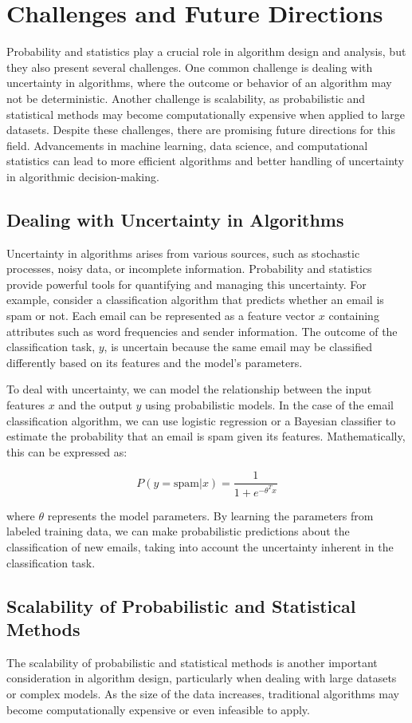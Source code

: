 \documentclass[12pt]{book} %
\begin{document}
\section{Challenges and Future Directions}
Probability and statistics play a crucial role in algorithm design and analysis, but they also present several challenges. One common challenge is dealing with uncertainty in algorithms, where the outcome or behavior of an algorithm may not be deterministic. Another challenge is scalability, as probabilistic and statistical methods may become computationally expensive when applied to large datasets. Despite these challenges, there are promising future directions for this field. Advancements in machine learning, data science, and computational statistics can lead to more efficient algorithms and better handling of uncertainty in algorithmic decision-making.

\subsection{Dealing with Uncertainty in Algorithms}
Uncertainty in algorithms arises from various sources, such as stochastic processes, noisy data, or incomplete information. Probability and statistics provide powerful tools for quantifying and managing this uncertainty. For example, consider a classification algorithm that predicts whether an email is spam or not. Each email can be represented as a feature vector \(x\) containing attributes such as word frequencies and sender information. The outcome of the classification task, \(y\), is uncertain because the same email may be classified differently based on its features and the model's parameters.

To deal with uncertainty, we can model the relationship between the input features \(x\) and the output \(y\) using probabilistic models. In the case of the email classification algorithm, we can use logistic regression or a Bayesian classifier to estimate the probability that an email is spam given its features. Mathematically, this can be expressed as:

\[
P(y = \text{spam} | x) = \frac{1}{1 + e^{-\theta^Tx}}
\]

where \(\theta\) represents the model parameters. By learning the parameters from labeled training data, we can make probabilistic predictions about the classification of new emails, taking into account the uncertainty inherent in the classification task.

\subsection{Scalability of Probabilistic and Statistical Methods}
The scalability of probabilistic and statistical methods is another important consideration in algorithm design, particularly when dealing with large datasets or complex models. As the size of the data increases, traditional algorithms may become computationally expensive or even infeasible to apply. 
\end{document}
